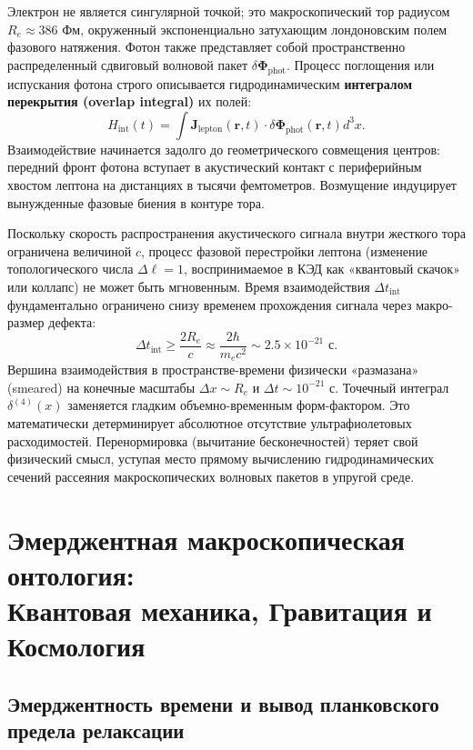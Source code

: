 \documentclass[11pt,a4paper]{article}
\begin{document}
Электрон не является сингулярной точкой; это макроскопический тор радиусом $R_e \approx 386$ Фм, окруженный экспоненциально затухающим лондоновским полем фазового натяжения. Фотон также представляет собой пространственно распределенный сдвиговый волновой пакет $\delta \mathbf{\Phi}_{\text{phot}}$. 
Процесс поглощения или испускания фотона строго описывается гидродинамическим \textbf{интегралом перекрытия (overlap integral)} их полей:
\begin{equation}
	H_{\text{int}}(t) = \int \mathbf{J}_{\text{lepton}}(\mathbf{r}, t) \cdot \delta \mathbf{\Phi}_{\text{phot}}(\mathbf{r}, t) d^3x.
\end{equation}
Взаимодействие начинается задолго до геометрического совмещения центров: передний фронт фотона вступает в акустический контакт с периферийным хвостом лептона на дистанциях в тысячи фемтометров. Возмущение индуцирует вынужденные фазовые биения в контуре тора.

Поскольку скорость распространения акустического сигнала внутри жесткого тора ограничена величиной $c$, процесс фазовой перестройки лептона (изменение топологического числа $\Delta \ell = 1$, воспринимаемое в КЭД как «квантовый скачок» или коллапс) не может быть мгновенным. Время взаимодействия $\Delta t_{\text{int}}$ фундаментально ограничено снизу временем прохождения сигнала через макро-размер дефекта:
\begin{equation}
	\Delta t_{\text{int}} \ge \frac{2 R_e}{c} \approx \frac{2 \hbar}{m_e c^2} \sim 2.5 \times 10^{-21} \text{ с}.
\end{equation}
Вершина взаимодействия в пространстве-времени физически «размазана» (smeared) на конечные масштабы $\Delta x \sim R_e$ и $\Delta t \sim 10^{-21}$ с. Точечный интеграл $\delta^{(4)}(x)$ заменяется гладким объемно-временным форм-фактором. Это математически детерминирует абсолютное отсутствие ультрафиолетовых расходимостей. 
Перенормировка (вычитание бесконечностей) теряет свой физический смысл, уступая место прямому вычислению гидродинамических сечений рассеяния макроскопических волновых пакетов в упругой среде.
	
	\section{Эмерджентная макроскопическая онтология:\\ Квантовая механика, Гравитация и Космология}

\subsection{Эмерджентность времени и вывод планковского предела релаксации}
\end{document}
